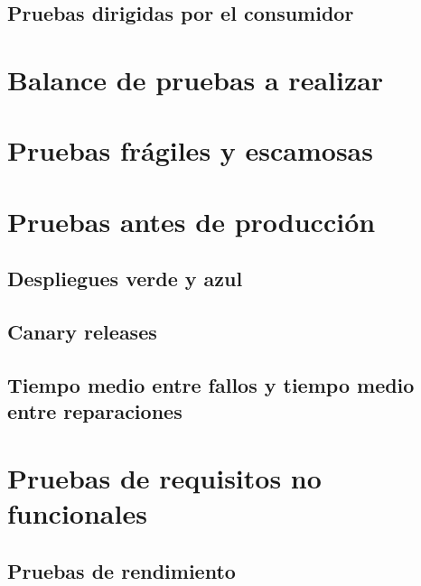 \documentclass[11pt,a4paper]{article}
\begin{document}
\subsection{Pruebas dirigidas por el consumidor}

\section{Balance de pruebas a realizar}

\section{Pruebas frágiles y escamosas}

\section{Pruebas antes de producción}

\subsection{Despliegues verde y azul}

\subsection{Canary releases}

\subsection{Tiempo medio entre fallos y tiempo medio entre reparaciones}

\section{Pruebas de requisitos no funcionales}

\subsection{Pruebas de rendimiento}
\end{document}

